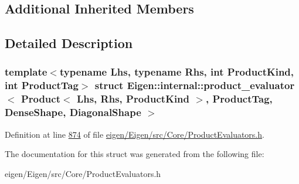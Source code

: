 \subsection*{Additional Inherited Members}


\subsection{Detailed Description}
\subsubsection*{template$<$typename Lhs, typename Rhs, int Product\+Kind, int Product\+Tag$>$\newline
struct Eigen\+::internal\+::product\+\_\+evaluator$<$ Product$<$ Lhs, Rhs, Product\+Kind $>$, Product\+Tag, Dense\+Shape, Diagonal\+Shape $>$}



Definition at line \hyperlink{eigen_2_eigen_2src_2_core_2_product_evaluators_8h_source_l00874}{874} of file \hyperlink{eigen_2_eigen_2src_2_core_2_product_evaluators_8h_source}{eigen/\+Eigen/src/\+Core/\+Product\+Evaluators.\+h}.



The documentation for this struct was generated from the following file\+:\begin{DoxyCompactItemize}
\item 
eigen/\+Eigen/src/\+Core/\+Product\+Evaluators.\+h\end{DoxyCompactItemize}
